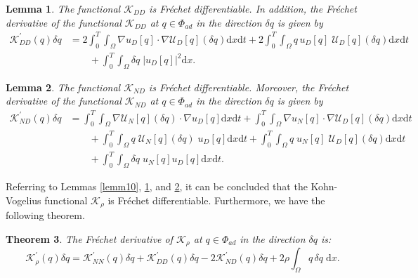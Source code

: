 \documentclass[a4paper,12pt,reqno,natbib]{amsart}
\newtheorem{theorem}{Theorem}
\newtheorem{lemma}[theorem]{Lemma}
\newcommand{\dx} {\displaystyle\mathrm{d}x}
\newcommand{\dt} {\displaystyle\mathrm{d}t}
\def\K{\mathcal K}
\begin{document}
\begin{lemma}\label{lemm100}
The functional $\mathcal{K}_{DD}$ is Fr\'echet differentiable. In addition, the Fr\'echet derivative of the functional $\mathcal{K}_{DD}$ at $q\in\Phi_{ad}$ in the direction $\delta q$ is given by
\begin{align*}
    \mathcal{K}_{DD}^{\prime}(q)\delta q&=2\int_0^T\int_\Omega\nabla u_D[q]\cdot\nabla \mathcal{U}_D[q](\delta q)\dx\dt +2\int_0^T\int_\Omega q\,u_D[q]\; \mathcal{U}_D[q](\delta q)\dx\dt\\
    &\qquad+\int_0^T\int_{\Omega}  \delta q\; |u_D[q]|^2 \dx.
\end{align*}
\end{lemma}

\begin{lemma}\label{lemm1000}
The functional $\mathcal{K}_{ND}$ is Fr\'echet differentiable. Moreover, the Fr\'echet derivative of the functional $\mathcal{K}_{ND}$ at $q\in\Phi_{ad}$ in the direction $\delta q$ is given by
\begin{align*}
    \mathcal{K}_{ND}^{\prime}(q)\delta q&=\int_0^T\int_{\Omega}\nabla \mathcal{U}_N[q](\delta q)\cdot \nabla u_D[q] \dx \dt + \int_0^T\int_{\Omega}  \nabla u_N[q]\cdot\nabla \mathcal{U}_D[q](\delta q) \dx \dt \\
  &\qquad+\int_0^T\int_{\Omega}  q\; \mathcal{U}_N[q](\delta q)\;u_D[q] \dx \dt +\int_0^T\int_{\Omega}  q\; u_N[q]\;\mathcal{U}_D[q](\delta q) \dx \dt\\
  &\qquad +\int_0^T\int_{\Omega} \delta q\;  u_N[q] u_D[q] \dx \dt.
\end{align*}
\end{lemma}

Referring to Lemmas \ref{lemm10}, \ref{lemm100}, and \ref{lemm1000}, it can be concluded that the Kohn-Vogelius functional $\K_\rho$ is Fr\'echet differentiable.  Furthermore, we have the following theorem.

\begin{theorem}\label{K-D-Rho}
The Fr\'echet derivative of $\mathcal{K}_{\rho}$ at $q\in\Phi_{ad}$ in the direction $\delta q$ is:
\begin{equation}\label{frechet-K-rho}
    \K^\prime_\rho(q)\delta q=\mathcal{K}_{NN}^{\prime}(q)\delta q+\mathcal{K}_{DD}^{\prime}(q)\delta q-2\mathcal{K}_{ND}^{\prime}(q)\delta q+2\rho\int_{\Omega} q\,\delta q\;\dx.
\end{equation}
\end{theorem}

\end{document}
